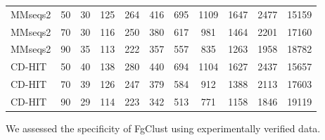 \documentclass[11pt,letterpaper]{article}
\begin{document}
\begin{table}
\begin{tabular}{l c c c c c c c c c c}
		MMseqs2  & 50 & 30 & 125 & 264 & 416 & 695 & 1109 & 1647 & 2477 & 15159 \\
		MMseqs2  & 70 & 30 & 116 & 250 & 380 & 617 & 981 & 1464 & 2201 & 17160 \\
		MMseqs2  & 90 & 35 & 113 & 222 & 357 & 557 & 835 & 1263 & 1958 & 18782 \\
		
		
		CD-HIT   & 50 & 40 & 138 & 280 & 440 & 694 & 1104 & 1627 & 2437 & 15657 \\
		CD-HIT   & 70 & 39 & 126 & 247 & 379 & 584 & 912 & 1388 & 2113 & 17603 \\
		CD-HIT   & 90 & 29 & 114 & 223 & 342 & 513 & 771 & 1158 & 1846 & 19119 \\
		

		

		
%		
%		
%		
		\bottomrule
	\end{tabular}
	\label{table:pdb}
\end{table}
We assessed the specificity of FgClust using experimentally verified data.
\end{document}
